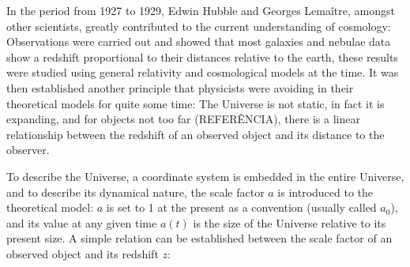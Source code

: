 \documentclass[openany,a4paper,12pt,oneside]{book}
\begin{document}
\begin{spacing}{1.5}



In the period from 1927 to 1929, Edwin Hubble and Georges Lemaître, amongst other scientists, greatly contributed to the current understanding of cosmology: Observations were carried out and showed that most galaxies and nebulae data show a redshift proportional to their distances relative to the earth\cite{hubble}, these results were studied using general relativity and cosmological models at the time\cite{Lemaitre:1927zz}. It was then established another principle that physicists were avoiding in their theoretical models for quite some time: The Universe is not static, in fact it is expanding, and for objects not too far (REFERÊNCIA), there is a linear relationship between the redshift of an observed object and its distance to the observer. 

To describe the Universe, a coordinate system is embedded in the entire Universe, and to describe its dynamical nature, the scale factor $a$ is introduced to the theoretical model: $a$ is set to 1 at the present as a convention (usually called $a_0$), and its value at any given time $a(t)$ is the size of the Universe relative to its present size. A simple relation can be established between the scale factor of an observed object and its redshift $z$:


\end{spacing}
\end{document}
